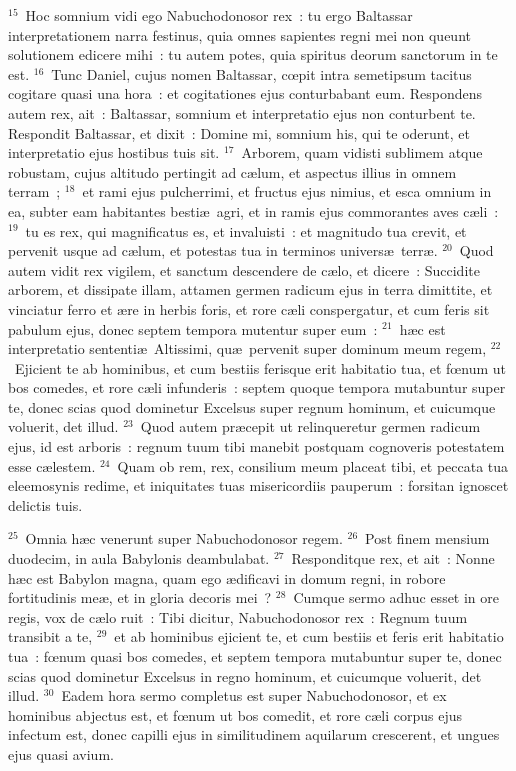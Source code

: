 ${}^{15}$~Hoc somnium vidi ego Nabuchodonosor rex~: tu ergo Baltassar interpretationem narra festinus, quia omnes sapientes regni mei non queunt solutionem edicere mihi~: tu autem potes, quia spiritus deorum sanctorum in te est.
${}^{16}$~Tunc Daniel, cujus nomen Baltassar, cœpit intra semetipsum tacitus cogitare quasi una hora~: et cogitationes ejus conturbabant eum. Respondens autem rex, ait~: Baltassar, somnium et interpretatio ejus non conturbent te. Respondit Baltassar, et dixit~: Domine mi, somnium his, qui te oderunt, et interpretatio ejus hostibus tuis sit.
${}^{17}$~Arborem, quam vidisti sublimem atque robustam, cujus altitudo pertingit ad c\ae lum, et aspectus illius in omnem terram~;
${}^{18}$~et rami ejus pulcherrimi, et fructus ejus nimius, et esca omnium in ea, subter eam habitantes besti\ae\ agri, et in ramis ejus commorantes aves c\ae li~:
${}^{19}$~tu es rex, qui magnificatus es, et invaluisti~: et magnitudo tua crevit, et pervenit usque ad c\ae lum, et potestas tua in terminos univers\ae\ terr\ae .
${}^{20}$~Quod autem vidit rex vigilem, et sanctum descendere de c\ae lo, et dicere~: Succidite arborem, et dissipate illam, attamen germen radicum ejus in terra dimittite, et vinciatur ferro et \ae re in herbis foris, et rore c\ae li conspergatur, et cum feris sit pabulum ejus, donec septem tempora mutentur super eum~:
${}^{21}$~h\ae c est interpretatio sententi\ae\ Altissimi, qu\ae\ pervenit super dominum meum regem,
${}^{22}$~Ejicient te ab hominibus, et cum bestiis ferisque erit habitatio tua, et fœnum ut bos comedes, et rore c\ae li infunderis~: septem quoque tempora mutabuntur super te, donec scias quod dominetur Excelsus super regnum hominum, et cuicumque voluerit, det illud.
${}^{23}$~Quod autem pr\ae cepit ut relinqueretur germen radicum ejus, id est arboris~: regnum tuum tibi manebit postquam cognoveris potestatem esse c\ae lestem.
${}^{24}$~Quam ob rem, rex, consilium meum placeat tibi, et peccata tua eleemosynis redime, et iniquitates tuas misericordiis pauperum~: forsitan ignoscet delictis tuis.


${}^{25}$~Omnia h\ae c venerunt super Nabuchodonosor regem.
${}^{26}$~Post finem mensium duodecim, in aula Babylonis deambulabat.
${}^{27}$~Responditque rex, et ait~: Nonne h\ae c est Babylon magna, quam ego \ae dificavi in domum regni, in robore fortitudinis me\ae , et in gloria decoris mei~?
${}^{28}$~Cumque sermo adhuc esset in ore regis, vox de c\ae lo ruit~: Tibi dicitur, Nabuchodonosor rex~: Regnum tuum transibit a te,
${}^{29}$~et ab hominibus ejicient te, et cum bestiis et feris erit habitatio tua~: fœnum quasi bos comedes, et septem tempora mutabuntur super te, donec scias quod dominetur Excelsus in regno hominum, et cuicumque voluerit, det illud.
${}^{30}$~Eadem hora sermo completus est super Nabuchodonosor, et ex hominibus abjectus est, et fœnum ut bos comedit, et rore c\ae li corpus ejus infectum est, donec capilli ejus in similitudinem aquilarum crescerent, et ungues ejus quasi avium.


